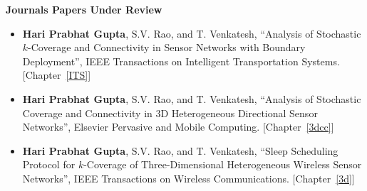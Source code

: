 \noindent \textbf{Journals Papers Under Review}
\begin{itemize}
\item   \textbf{Hari Prabhat Gupta}, S.V. Rao, and T. Venkatesh, ``Analysis of Stochastic $k$-Coverage and Connectivity in Sensor Networks with Boundary Deployment'', IEEE Transactions on Intelligent Transportation Systems. [Chapter~\ref{ITS}]
\item   \textbf{Hari Prabhat Gupta}, S.V. Rao, and T. Venkatesh, ``Analysis of Stochastic Coverage and Connectivity in 3D Heterogeneous Directional Sensor Networks'', Elsevier Pervasive and Mobile Computing. [Chapter~\ref{3dcc}]
\item   \textbf{Hari Prabhat Gupta}, S.V. Rao, and T. Venkatesh, ``Sleep Scheduling Protocol for $k$-Coverage of Three-Dimensional Heterogeneous Wireless Sensor Networks'', IEEE Transactions on Wireless Communications. [Chapter~\ref{3d}]
\end{itemize}
